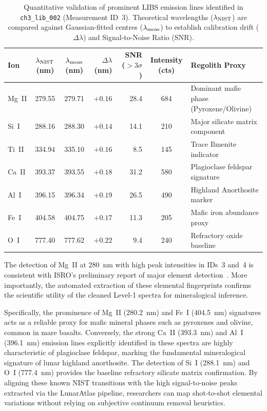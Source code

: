 \documentclass[a4paper,twocolumn,10pt]{article}
\begin{document}
\begin{table}[htbp]
\centering
\caption{Quantitative validation of prominent LIBS emission lines
  identified in \texttt{ch3\_lib\_002} (Measurement ID~3).
  Theoretical wavelengths ($\lambda_{\rm NIST}$) are compared against
  Gaussian-fitted centres ($\lambda_{\rm meas}$) to establish calibration drift
  ($\Delta\lambda$) and Signal-to-Noise Ratio (SNR).}
\label{tab:emission_lines}
\begin{tabularx}{\textwidth}{@{}lccrrcX@{}}
\toprule
\textbf{Ion} & \textbf{$\lambda_{\rm NIST}$ (nm)} & \textbf{$\lambda_{\rm meas}$ (nm)} &
\textbf{$\Delta\lambda$ (nm)} & \textbf{SNR ($>\!3\sigma$)} & \textbf{Intensity (cts)} & \textbf{Regolith Proxy} \\
\midrule
Mg~II & 279.55 & 279.71 & $+0.16$ & 28.4 & 684 & Dominant mafic phase (Pyroxene/Olivine)\\
Si~I  & 288.16 & 288.30 & $+0.14$ & 14.1 & 210 & Major silicate matrix component \\
Ti~II & 334.94 & 335.10 & $+0.16$ & 8.5  & 145 & Trace Ilmenite indicator \\
Ca~II & 393.37 & 393.55 & $+0.18$ & 31.2 & 580 & Plagioclase feldspar signature \\
Al~I  & 396.15 & 396.34 & $+0.19$ & 26.5 & 490 & Highland Anorthosite marker \\
Fe~I  & 404.58 & 404.75 & $+0.17$ & 11.3 & 205 & Mafic iron abundance proxy \\
O~I   & 777.40 & 777.62 & $+0.22$ & 9.4  & 240 & Refractory oxide baseline \\
\bottomrule
\end{tabularx}
\end{table}

The detection of Mg~II at 280~nm with high peak intensities in IDs~3
and~4 is consistent with ISRO's preliminary report of major element
detection~\cite{ISROCh3}. More importantly, the automated extraction of
these elemental fingerprints confirms the scientific utility of the
cleaned Level-1 spectra for mineralogical inference. 

Specifically, the prominence of Mg~II (280.2~nm) and Fe~I (404.5~nm)
signatures acts as a reliable proxy for mafic mineral phases such as
pyroxenes and olivine, common in mare basalts. Conversely, the strong
Ca~II (393.3~nm) and Al~I (396.1~nm) emission lines explicitly identified
in these spectra are highly characteristic of plagioclase feldspar, marking
the fundamental mineralogical signature of lunar highland anorthosite.
The detection of Si~I (288.1~nm) and O~I (777.4~nm) provides the baseline
refractory silicate matrix confirmation. By aligning these known NIST
transitions with the high signal-to-noise peaks extracted via the
LunarAtlas pipeline, researchers can map shot-to-shot elemental
variations without relying on subjective continuum removal heuristics.
\end{document}
